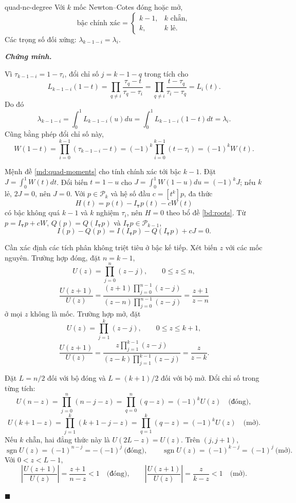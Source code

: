 \documentclass[12pt,a4paper,oneside]{book}
\numberwithin{algorithm}{chapter}
\theoremstyle{definition}
\newenvironment{chungminh}{\par\medskip\noindent\textbf{\textit{\color{mainblue}Chứng minh.}}\ }{\hfill$\blacksquare$\par\medskip}
\begin{document}
\begin{dinhly}{}{quad-nc-degree}
Với $k$ mốc Newton--Cotes đóng hoặc mở,
\[
 \text{bậc chính xác}=
 \begin{cases}k-1,&k\text{ chẵn},\\k,&k\text{ lẻ}.\end{cases}
\]
Các trọng số đối xứng: $\lambda_{k-1-i}=\lambda_i$.
\end{dinhly}
\begin{chungminh}

Vì $\tau_{k-1-i}=1-\tau_i$, đổi chỉ số $j=k-1-q$ trong tích cho
\[
 L_{k-1-i}(1-t)=\prod_{q\ne i}\frac{\tau_q-t}{\tau_q-\tau_i}
 =\prod_{q\ne i}\frac{t-\tau_q}{\tau_i-\tau_q}=L_i(t).
\]
Do đó
\[
 \lambda_{k-1-i}=\int_0^1L_{k-1-i}(u)du
 =\int_0^1L_{k-1-i}(1-t)dt=\lambda_i.
\]
Cũng bằng phép đổi chỉ số này,
\[
 W(1-t)=\prod_{i=0}^{k-1}(\tau_{k-1-i}-t)
 =(-1)^k\prod_{i=0}^{k-1}(t-\tau_i)=(-1)^kW(t).
\]

Mệnh đề \ref{md:quad-moments} cho tính chính xác tới bậc $k-1$. Đặt $J=\int_0^1W(t)dt$. Đổi biến $t=1-u$ cho $J=\int_0^1W(1-u)du=(-1)^kJ$; nếu $k$ lẻ, $2J=0$, nên $J=0$. Với $p\in\mathcal P_k$ và hệ số đầu $c=[t^k]p$, đa thức
\[
 H(t)=p(t)-I_{\boldsymbol\tau}p(t)-cW(t)
\]
có bậc không quá $k-1$ và $k$ nghiệm $\tau_i$, nên $H=0$ theo bổ đề \ref{bd:roots}. 
Từ $p=I_{\boldsymbol\tau}p+cW$, $Q(p)=Q(I_{\boldsymbol\tau}p)$ và $I_{\boldsymbol\tau}p\in\mathcal P_{k-1}$,
\[
 I(p)-Q(p)=I(I_{\boldsymbol\tau}p)-Q(I_{\boldsymbol\tau}p)+cJ=0.
\]

Cần xác định các tích phân không triệt tiêu ở bậc kế tiếp. Xét biến $z$ với các mốc nguyên. Trường hợp đóng, đặt $n=k-1$,
\[
 U(z)=\prod_{j=0}^{n}(z-j),\qquad0\leq z\leq n,
\]
\[
 \frac{U(z+1)}{U(z)}
 =\frac{(z+1)\prod_{j=0}^{n-1}(z-j)}{(z-n)\prod_{j=0}^{n-1}(z-j)}=\frac{z+1}{z-n}
\]
ở mọi $z$ không là mốc. Trường hợp mở, đặt
\[
 U(z)=\prod_{j=1}^{k}(z-j),\qquad0\leq z\leq k+1,
\]
\[
 \frac{U(z+1)}{U(z)}
 =\frac{z\prod_{j=1}^{k-1}(z-j)}{(z-k)\prod_{j=1}^{k-1}(z-j)}=\frac z{z-k}.
\]

Đặt $L=n/2$ đối với bộ đóng và $L=(k+1)/2$ đối với bộ mở. 
Đổi chỉ số trong từng tích:
\[
 U(n-z)=\prod_{j=0}^n(n-j-z)=\prod_{q=0}^n(q-z)=(-1)^kU(z)\quad\text{(đóng)},
\]
\[
 U(k+1-z)=\prod_{j=1}^k(k+1-j-z)=\prod_{q=1}^k(q-z)=(-1)^kU(z)\quad\text{(mở)}.
\]
Nếu $k$ chẵn, hai đẳng thức này là $U(2L-z)=U(z)$. Trên $(j,j+1)$,
\[
 \operatorname{sgn}U(z)=(-1)^{n-j}=-(-1)^j\ \text{(đóng)},\qquad
 \operatorname{sgn}U(z)=(-1)^{k-j}=(-1)^j\ \text{(mở)}.
\] Với $0<z<L-1$,
\[
 \left|\frac{U(z+1)}{U(z)}\right|
 =\frac{z+1}{n-z}<1\quad\text{(đóng)},\qquad
 \left|\frac{U(z+1)}{U(z)}\right|=\frac z{k-z}<1\quad\text{(mở)}.
\]


\end{chungminh}
\end{document}
